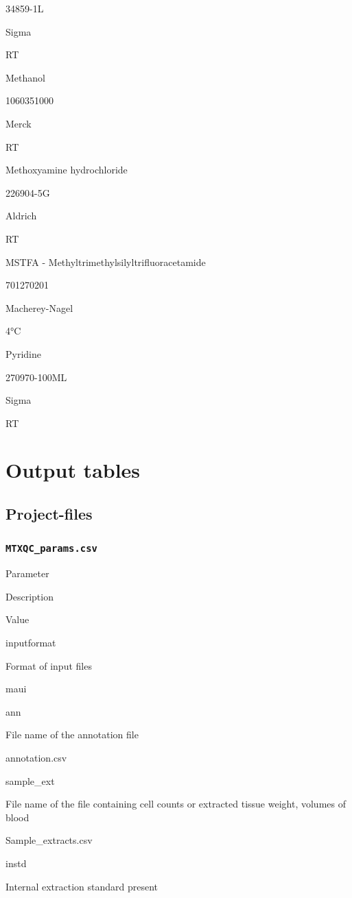\documentclass[]{book}
\theoremstyle{definition}
\theoremstyle{definition}
\theoremstyle{definition}
\theoremstyle{remark}
\begin{document}
34859-1L

Sigma

RT

Methanol

1060351000

Merck

RT

Methoxyamine hydrochloride

226904-5G

Aldrich

RT

MSTFA - Methyltrimethylsilyltrifluoracetamide

701270201

Macherey-Nagel

4°C

Pyridine

270970-100ML

Sigma

RT

\chapter{Output tables}\label{output}

\section{Project-files}\label{o_project}

\subsection{\texorpdfstring{\texttt{MTXQC\_params.csv}}{MTXQC\_params.csv}}\label{mtxqc_params.csv}

Parameter

Description

Value

inputformat

Format of input files

maui

ann

File name of the annotation file

annotation.csv

sample\_ext

File name of the file containing cell counts or extracted tissue weight,
volumes of blood

Sample\_extracts.csv

instd

Internal extraction standard present
\end{document}
